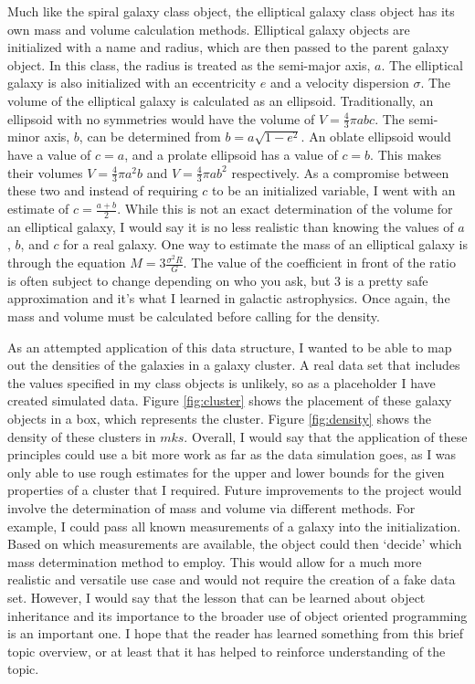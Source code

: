 \documentclass[twocolumn,11pt]{article}
\begin{document}
Much like the spiral galaxy class object, the elliptical galaxy class object has its own mass and volume calculation methods. Elliptical galaxy objects are initialized with a name and radius, which are then passed to the parent galaxy object. In this class, the radius is treated as the semi-major axis, $a$. The elliptical galaxy is also initialized with an eccentricity $e$ and a velocity dispersion $\sigma$. The volume of the elliptical galaxy is calculated as an ellipsoid. Traditionally, an ellipsoid with no symmetries would have the volume of $V=\frac{4}{3}\pi abc$. The semi-minor axis, $b$, can be determined from $b=a\sqrt{1-e^2}$. An oblate ellipsoid would have a value of $c=a$, and a prolate ellipsoid has a value of $c=b$. This makes their volumes $V=\frac{4}{3}\pi a^2b$ and $V=\frac{4}{3}\pi ab^2$ respectively. As a compromise between these two and instead of requiring $c$ to be an initialized variable, I went with an estimate of $c=\frac{a+b}{2}$. While this is not an exact determination of the volume for an elliptical galaxy, I would say it is no less realistic than knowing the values of $a$, $b$, and $c$ for a real galaxy. One way to estimate the mass of an elliptical galaxy is through the equation $M=3\frac{\sigma^2R}{G}$. The value of the coefficient in front of the ratio is often subject to change depending on who you ask, but 3 is a pretty safe approximation and it's what I learned in galactic astrophysics. Once again, the mass and volume must be calculated before calling for the density.

As an attempted application of this data structure, I wanted to be able to map out the densities of the galaxies in a galaxy cluster. A real data set that includes the values specified in my class objects is unlikely, so as a placeholder I have created simulated data. Figure \ref{fig:cluster} shows the placement of these galaxy objects in a box, which represents the cluster. Figure \ref{fig:density} shows the density of these clusters in $mks$. Overall, I would say that the application of these principles could use a bit more work as far as the data simulation goes, as I was only able to use rough estimates for the upper and lower bounds for the given properties of a cluster that I required. Future improvements to the project would involve the determination of mass and volume via different methods. For example, I could pass all known measurements of a galaxy into the initialization. Based on which measurements are available, the object could then `decide' which mass determination method to employ. This would allow for a much more realistic and versatile use case and would not require the creation of a fake data set. However, I would say that the lesson that can be learned about object inheritance and its importance to the broader use of object oriented programming is an important one. I hope that the reader has learned something from this brief topic overview, or at least that it has helped to reinforce understanding of the topic.
\end{document}
